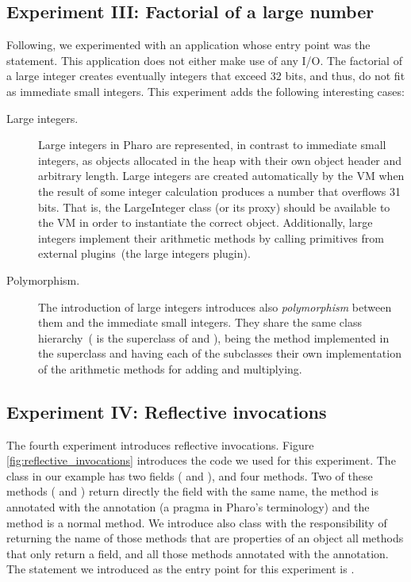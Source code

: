 \subsection{Experiment III: Factorial of a large number}

Following, we experimented with an application whose entry point was the  statement. This application does not either make use of any I/O. The factorial of a large integer creates eventually integers that exceed 32 bits, and thus, do not fit as immediate small integers. This experiment adds the following interesting cases:
\begin{description}
\item[Large integers.] Large integers in Pharo are represented, in contrast to immediate small integers, as objects allocated in the heap with their own object header and arbitrary length. Large integers are created automatically by the VM when the result of some integer calculation produces a number that overflows 31 bits. That is, the LargeInteger class (or its proxy) should be available to the VM in order to instantiate the correct object.  Additionally, large integers implement their arithmetic methods by calling primitives from external plugins~(the large integers plugin).
\item[Polymorphism.] The introduction of large integers introduces also \emph{polymorphism} between them and the immediate small integers. They share the same class hierarchy~( is the superclass of  and ), being the method  implemented in the superclass and having each of the subclasses their own implementation of the arithmetic methods for adding and multiplying.
\end{description}

\subsection{Experiment IV: Reflective invocations} \label{sec:results_helloworld}

The fourth experiment introduces reflective invocations. Figure \ref{fig:reflective_invocations} introduces the code we used for this experiment. The  class in our example has two fields ( and ), and four methods. Two of these methods ( and ) return directly the field with the same name, the method  is annotated with the  annotation (a pragma in Pharo's terminology) and the method  is a normal method. We introduce also  class with the responsibility of returning the name of those methods that are properties of an object \ie all methods that only return a field, and all those methods annotated with the  annotation. The statement we introduced as the entry point for this experiment is .

